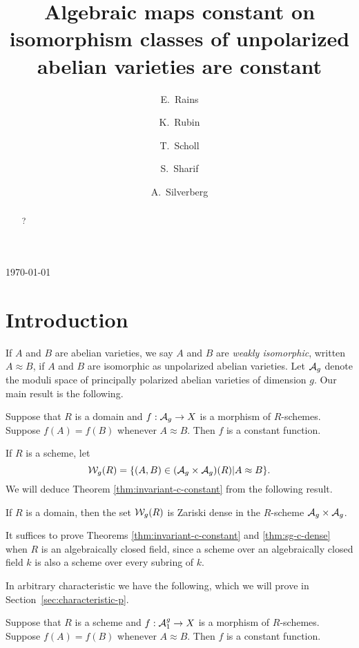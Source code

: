 \documentclass{amsart}
\title[Algebraic maps constant on unpolarized isomorphism classes]{Algebraic maps constant on isomorphism classes of unpolarized abelian varieties are constant}
\author[E.\ Rains]{E.\ Rains}
\author[K.\ Rubin]{K.\ Rubin}
\author[T.\ Scholl]{T.\ Scholl}
\author[S.\ Sharif]{S.\ Sharif}
\author[A.\ Silverberg]{A.\ Silverberg}
\begin{document}
\begin{abstract}
?
\end{abstract}


\today
\maketitle



\section{Introduction}
\label{sec:introduction}

If $A$ and $B$ are abelian varieties, we say $A$ and $B$ are \emph{weakly isomorphic}, written $A \approx B$, if $A$ and $B$ are isomorphic as unpolarized abelian varieties. Let $\mathcal{A}_g$ denote the moduli space of principally polarized abelian varieties of dimension $g$. Our main result is the following.
\begin{theorem}\label{thm:invariant-c-constant}
  Suppose that $R$ is a domain and $f: \mathcal{A}_g \to X$ is a morphism of $R$-schemes. Suppose $f(A) = f(B)$ whenever $A \approx B$. Then $f$ is a constant function.
\end{theorem}

If $R$ is a scheme, let
$$
\mathcal{W}_g(R) = \{(A,B) \in (\mathcal{A}_g \times \mathcal{A}_g)(R) | A \approx B\}.
$$
We will deduce Theorem \ref{thm:invariant-c-constant} from the following result.

\begin{theorem}\label{thm:sg-c-dense}
  If $R$ is a domain, then the set $\mathcal{W}_g(R)$ is Zariski dense in the $R$-scheme $\mathcal{A}_g \times \mathcal{A}_g$.
\end{theorem}
It suffices to prove Theorems \ref{thm:invariant-c-constant} and \ref{thm:sg-c-dense} when $R$ is an algebraically closed field, since a scheme over an algebraically closed field $k$ is also a scheme over every subring of $k$.

In arbitrary characteristic we have the following, which we will prove in Section~\ref{sec:characteristic-p}.
\begin{theorem}\label{thm:arbit-char}
  Suppose that $R$ is a scheme and $f: \mathcal{A}_1^g \to X$ is a morphism of $R$-schemes. Suppose $f(A) = f(B)$ whenever $A \approx B$. Then $f$ is a constant function.
\end{theorem}
\end{document}
